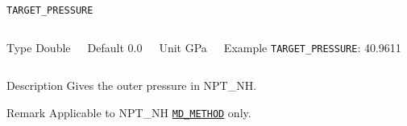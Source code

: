 \begin{frame}[allowframebreaks]{\texttt{TARGET\_PRESSURE}} \label{TARGET_PRESSURE}
\vspace*{-12pt}
\begin{columns}
\begin{block}{Type}
Double
\end{block}

\begin{block}{Default}
0.0
\end{block}

\begin{block}{Unit}
GPa
\end{block}

\begin{block}{Example}
\texttt{TARGET\_PRESSURE}: 40.9611
\end{block}
\end{columns}

\begin{block}{Description}
Gives the outer pressure in NPT\_NH.
\end{block}

\begin{block}{Remark}
Applicable to NPT\_NH \hyperlink{MD_METHOD}{\texttt{MD\_METHOD}} only.
\end{block}

\end{frame}



